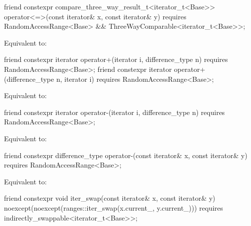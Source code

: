 %
\begin{itemdecl}
friend constexpr compare_three_way_result_t<iterator_t<Base>>
  operator<=>(const iterator& x, const iterator& y)
    requires RandomAccessRange<Base> && ThreeWayComparable<iterator_t<Base>>;
\end{itemdecl}

\begin{itemdescr}
\pnum
\effects Equivalent to: 
\end{itemdescr}

\begin{itemdecl}
friend constexpr iterator operator+(iterator i, difference_type n)
  requires RandomAccessRange<Base>;
friend constexpr iterator operator+(difference_type n, iterator i)
  requires RandomAccessRange<Base>;
\end{itemdecl}

\begin{itemdescr}
\pnum
\effects Equivalent to: 
\end{itemdescr}

%
\begin{itemdecl}
friend constexpr iterator operator-(iterator i, difference_type n)
  requires RandomAccessRange<Base>;
\end{itemdecl}

\begin{itemdescr}
\pnum
\effects Equivalent to: 
\end{itemdescr}

%
\begin{itemdecl}
friend constexpr difference_type operator-(const iterator& x, const iterator& y)
  requires RandomAccessRange<Base>;
\end{itemdecl}

\begin{itemdescr}
\pnum
\effects Equivalent to: 
\end{itemdescr}

\begin{itemdecl}
friend constexpr void iter_swap(const iterator& x, const iterator& y)
  noexcept(noexcept(ranges::iter_swap(x.current_, y.current_)))
  requires indirectly_swappable<iterator_t<Base>>;
\end{itemdecl}

